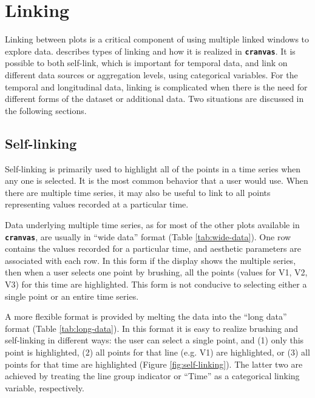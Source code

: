 \documentclass[12pt]{article}
\begin{document}
\section{Linking\label{sec:Linking}}

Linking between plots is a critical component of using multiple linked
windows \citep{stuetzle1987plot} to explore data. \citet{xie2014reactive} describes
types of linking and how it is realized in \texttt{\textbf{cranvas}}.
It is possible to both self-link, which is important for temporal data,
and link on different data sources or aggregation levels, using
categorical variables. For the temporal and longitudinal data,
linking is complicated when there is the need for different forms of
the dataset or additional data. Two situations are discussed in
the following sections.

\subsection{Self-linking}

Self-linking is primarily used to highlight all of the points in a time series when any one is selected. It is the most common behavior that a user would use. When there are multiple time series, it may also be useful to link to all points representing values recorded at a particular time.

Data underlying multiple time series, as for most of the other
plots available in \texttt{\textbf{cranvas}}, are usually in
``wide data'' format (Table \ref{tab:wide-data}). One row contains
the values recorded for a particular time, and aesthetic
parameters are associated with each row. In this form if the
display shows the multiple series, then when a user selects
one point by brushing, all the points (values for V1, V2, V3)
for this time are highlighted. This form is not conducive to
selecting either a single point or an entire time series.


A more flexible format is provided by melting the data
into the ``long data'' format (Table \ref{tab:long-data}).
In this format it is easy to realize brushing and self-linking
in different ways: the user can select a single point, and
(1) only this point is highlighted, (2) all points for
that line (e.g. V1) are highlighted, or (3) all points
for that time are highlighted (Figure \ref{fig:self-linking}).
The latter two are achieved by treating the line group
indicator or ``Time'' as a categorical linking variable,
respectively.
\end{document}
